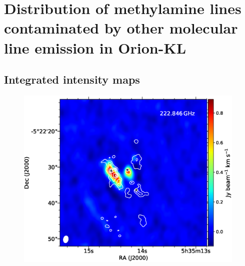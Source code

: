 \chapter{Distribution of methylamine lines contaminated by other molecular line emission in Orion-KL
\label{chap:appendixA}}

\section{Integrated intensity maps}

\begin{figure}[htbp] 
\begin{center}
\begin{minipage}{0.98\textwidth} 
\begin{center}
\begin{minipage}{0.48\textwidth}
\begin{center}
\includegraphics[width=0.98\textwidth]{OrionKL/mom0/222.846SV_mom0_3-7.eps}
\end{center}
\end{minipage}
\begin{minipage}{0.48\textwidth}
\begin{center}

\end{center}
\end{minipage}
\end{center}
\end{minipage}
\end{center}
\end{figure}

